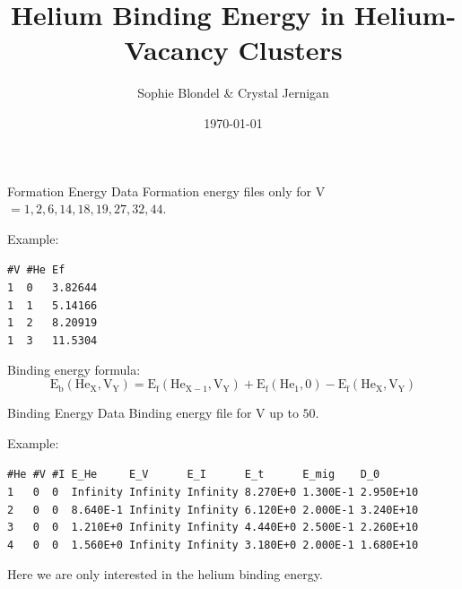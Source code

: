 \documentclass[10pt]{beamer}
\begin{document}
\title{\textbf{Helium Binding Energy in Helium-Vacancy Clusters}} 
\author{Sophie Blondel \& Crystal Jernigan}  
\date{\today}

\frame{\titlepage}

\begin{frame}{Formation Energy Data}
	Formation energy files only for V~$= 1, 2, 6, 14, 18, 19, 27, 32, 44$. \newline
	
	Example:
	
	\texttt{\#V \#He Ef \\
	1 ~0  ~~3.82644  \\                                                                                           
	1 ~1  ~~5.14166  \\                                                                                        
	1 ~2  ~~8.20919  \\                                                                                         
	1 ~3  ~~11.5304} \newline
	
	Binding energy formula:
	$$\text{E}_{\text{b}}(\text{He}_{\text{X}}, \text{V}_{\text{Y}}) =
	\text{E}_{\text{f}}(\text{He}_{\text{X}-1}, \text{V}_{\text{Y}}) +
	\text{E}_{\text{f}}(\text{He}_1, 0) -
	\text{E}_{\text{f}}(\text{He}_{\text{X}}, \text{V}_{\text{Y}})$$
\end{frame}

\begin{frame}{Binding Energy Data}
	Binding energy file for V up to $50$. \newline
	
	Example:
	
	\texttt{\#He \#V \#I E\_He ~~~~E\_V ~~~~~E\_I ~~~~~E\_t ~~~~~E\_mig
	~~~D\_0
	\\
	1 ~~0 ~0 ~Infinity Infinity Infinity 8.270E+0 1.300E-1 2.950E+10 \\
	2 ~~0 ~0 ~8.640E-1 Infinity Infinity 6.120E+0 2.000E-1 3.240E+10 \\
	3 ~~0 ~0 ~1.210E+0 Infinity Infinity 4.440E+0 2.500E-1 2.260E+10 \\
	4 ~~0 ~0 ~1.560E+0 Infinity Infinity 3.180E+0 2.000E-1 1.680E+10 } \newline
	
	Here we are only interested in the helium binding energy.
\end{frame}
\end{document}
